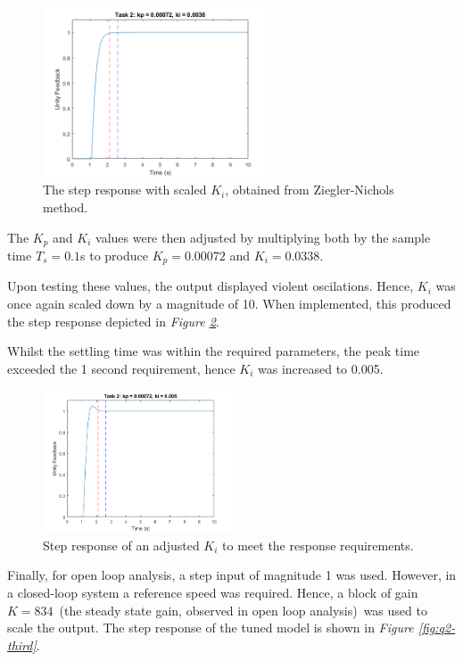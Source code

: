 \documentclass[11pt, onecolumn]{article}
\begin{document}
\begin{figure}[h!]
    \centering
    \includegraphics[width=0.6\textwidth]{q2-g2.png}
    \caption{The step response with scaled $K_i$, obtained from Ziegler-Nichols method.}
    \label{fig:q2-first}
\end{figure}
\par The $K_p$ and $K_i$ values were then adjusted by multiplying both by the sample time $T_s = 0.1$s to produce $K_p = 0.00072$ and $K_i = 0.0338$.
\par Upon testing these values, the output displayed violent oscilations. Hence, $K_i$ was once again scaled down by a magnitude of 10. When implemented, this produced the step response depicted in \textit{Figure \ref{fig:q2-second}}.
\par Whilst the settling time was within the required parameters, the peak time exceeded the 1 second requirement, hence $K_i$ was increased to 0.005.
\begin{figure}[h!]
    \centering
    \includegraphics[width=0.5\textwidth]{q2-g3.png}
    \caption{Step response of an adjusted $K_i$ to meet the response requirements.}
    \label{fig:q2-second}
\end{figure}
\par Finally, for open loop analysis, a step input of magnitude 1 was used. However, in a closed-loop system a reference speed was required. Hence, a block of gain $K=834$ (the steady state gain, observed in open loop analysis) was used to scale the output. The step response of the tuned model is shown in \textit{Figure \ref{fig:q2-third}}.
\end{document}
